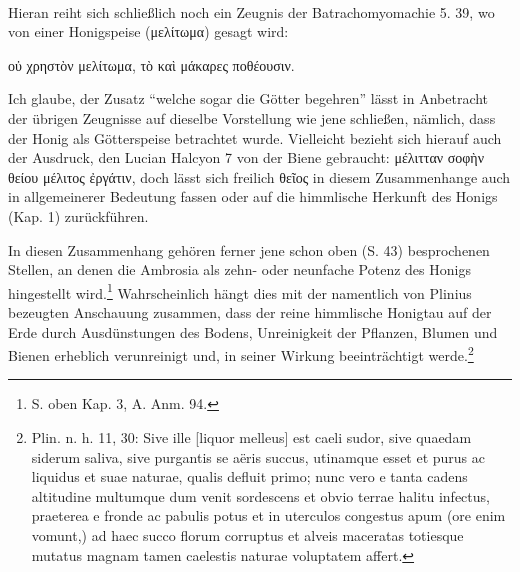 \documentclass[a4paper, 11pt, oneside]{article}
\begin{document}
\paragraph{}
Hieran reiht sich schließlich noch ein Zeugnis der Batrachomyomachie 5. 39, wo von einer Honigspeise (μελίτωμα) gesagt wird:

οὐ χρηστὸν μελίτωμα, τὸ καὶ μάκαρες ποθέουσιν.

Ich glaube, der Zusatz "`welche sogar die Götter begehren"' lässt in Anbetracht der übrigen Zeugnisse auf dieselbe Vorstellung wie jene schließen, nämlich, dass der Honig als Götterspeise betrachtet wurde. Vielleicht bezieht sich hierauf auch der Ausdruck, den Lucian Halcyon 7 von der Biene gebraucht: μέλιτταν σοφὴν θείου μέλιτος ἐργάτιν, doch lässt sich freilich θεῖος in diesem Zusammenhange auch in allgemeinerer Bedeutung fassen oder auf die himmlische Herkunft des Honigs (Kap. 1) zurückführen.

In diesen Zusammenhang gehören ferner jene schon oben (S. 43) besprochenen Stellen, an denen die Ambrosia als zehn- oder neunfache Potenz des Honigs hingestellt wird.\footnote{S. oben Kap. 3, A. Anm. 94.} Wahrscheinlich hängt dies mit der namentlich von Plinius bezeugten Anschauung zusammen, dass der reine himmlische Honigtau auf der Erde durch Ausdünstungen des Bodens, Unreinigkeit der Pflanzen, Blumen und Bienen erheblich verunreinigt und, in seiner Wirkung beeinträchtigt werde.\footnote{Plin. n. h. 11, 30: Sive ille [liquor melleus] est caeli sudor, sive quaedam siderum saliva, sive purgantis se aëris succus, utinamque esset et purus ac liquidus et suae naturae, qualis defluit primo; nunc vero e tanta cadens altitudine multumque dum venit sordescens et obvio terrae halitu infectus, praeterea e fronde ac pabulis potus et in uterculos congestus apum (ore enim vomunt,) ad haec succo florum corruptus et alveis maceratas totiesque mutatus magnam tamen caelestis naturae voluptatem affert.}
\end{document}
